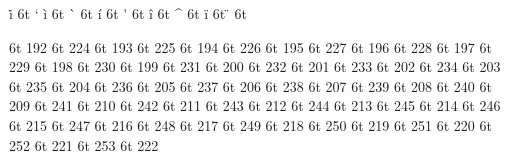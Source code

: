 \let\i=\dotlessi \let\j=\dotlessj
\accentdef  \. i     6t  `\i
\accentdef  \` i     6t  { \i}
\accentdef  \` {\i}  6t  { \i}
\accentdef  \' i     6t  { \i}
\accentdef  \' {\i}  6t  { \i}
\accentdef  \^ i     6t  { \i}
\accentdef  \^ {\i}  6t  { \i}
\accentdef  \" i     6t  { \i}
\accentdef  \" {\i}  6t  { \i}

\characterdef \CYRA         6t  192
\characterdef \cyra         6t  224
\characterdef \CYRB         6t  193
\characterdef \cyrb         6t  225
\characterdef \CYRV         6t  194
\characterdef \cyrv         6t  226
\characterdef \CYRG         6t  195
\characterdef \cyrg         6t  227
\characterdef \CYRD         6t  196
\characterdef \cyrd         6t  228
\characterdef \CYRE         6t  197
\characterdef \cyre         6t  229
\characterdef \CYRZH        6t  198
\characterdef \cyrzh        6t  230
\characterdef \CYRZ         6t  199
\characterdef \cyrz         6t  231
\characterdef \CYRI         6t  200
\characterdef \cyri         6t  232
\characterdef \CYRISHRT     6t  201
\characterdef \cyrishrt     6t  233
\characterdef \CYRK         6t  202
\characterdef \cyrk         6t  234
\characterdef \CYRL         6t  203
\characterdef \cyrl         6t  235
\characterdef \CYRM         6t  204
\characterdef \cyrm         6t  236
\characterdef \CYRN         6t  205
\characterdef \cyrn         6t  237
\characterdef \CYRO         6t  206
\characterdef \cyro         6t  238
\characterdef \CYRP         6t  207
\characterdef \cyrp         6t  239
\characterdef \CYRR         6t  208
\characterdef \cyrr         6t  240
\characterdef \CYRS         6t  209
\characterdef \cyrs         6t  241
\characterdef \CYRT         6t  210
\characterdef \cyrt         6t  242
\characterdef \CYRU         6t  211
\characterdef \cyru         6t  243
\characterdef \CYRF         6t  212
\characterdef \cyrf         6t  244
\characterdef \CYRH         6t  213
\characterdef \cyrh         6t  245
\characterdef \CYRC         6t  214
\characterdef \cyrc         6t  246
\characterdef \CYRCH        6t  215
\characterdef \cyrch        6t  247
\characterdef \CYRSH        6t  216
\characterdef \cyrsh        6t  248
\characterdef \CYRSHCH      6t  217
\characterdef \cyrshch      6t  249
\characterdef \CYRHRDSN     6t  218
\characterdef \cyrhrdsn     6t  250
\characterdef \CYRERY       6t  219
\characterdef \cyrery       6t  251
\characterdef \CYRSFTSN     6t  220
\characterdef \cyrsftsn     6t  252
\characterdef \CYREREV      6t  221
\characterdef \cyrerev      6t  253
\characterdef \CYRYU        6t  222
